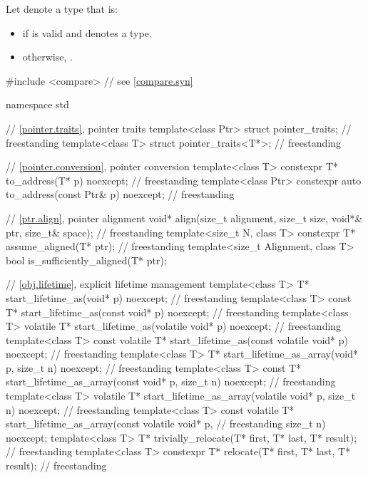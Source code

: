 \pnum
Let  denote a type that is:
\begin{itemize}
\item
{}
if  is valid and denotes a type,
\item
otherwise, .
\end{itemize}

\begin{codeblock}
#include <compare>              // see \ref{compare.syn}

namespace std {
  // \ref{pointer.traits}, pointer traits
  template<class Ptr> struct pointer_traits;                                        // freestanding
  template<class T> struct pointer_traits<T*>;                                      // freestanding

  // \ref{pointer.conversion}, pointer conversion
  template<class T>
    constexpr T* to_address(T* p) noexcept;                                         // freestanding
  template<class Ptr>
    constexpr auto to_address(const Ptr& p) noexcept;                               // freestanding

  // \ref{ptr.align}, pointer alignment
  void* align(size_t alignment, size_t size, void*& ptr, size_t& space);            // freestanding
  template<size_t N, class T>
    constexpr T* assume_aligned(T* ptr);                                            // freestanding
  template<size_t Alignment, class T>
    bool is_sufficiently_aligned(T* ptr);

  // \ref{obj.lifetime}, explicit lifetime management
  template<class T>
    T* start_lifetime_as(void* p) noexcept;                                         // freestanding
  template<class T>
    const T* start_lifetime_as(const void* p) noexcept;                             // freestanding
  template<class T>
    volatile T* start_lifetime_as(volatile void* p) noexcept;                       // freestanding
  template<class T>
    const volatile T* start_lifetime_as(const volatile void* p) noexcept;           // freestanding
  template<class T>
    T* start_lifetime_as_array(void* p, size_t n) noexcept;                         // freestanding
  template<class T>
    const T* start_lifetime_as_array(const void* p, size_t n) noexcept;             // freestanding
  template<class T>
    volatile T* start_lifetime_as_array(volatile void* p, size_t n) noexcept;       // freestanding
  template<class T>
    const volatile T* start_lifetime_as_array(const volatile void* p,               // freestanding
	                                      size_t n) noexcept;
  template<class T>
    T* trivially_relocate(T* first, T* last, T* result);                            // freestanding
  template<class T>
    constexpr T* relocate(T* first, T* last, T* result);                            // freestanding

}
\end{codeblock}
